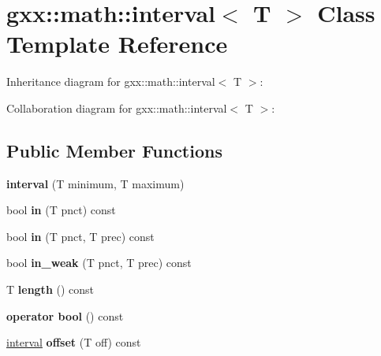 \hypertarget{classgxx_1_1math_1_1interval}{}\section{gxx\+:\+:math\+:\+:interval$<$ T $>$ Class Template Reference}
\label{classgxx_1_1math_1_1interval}


Inheritance diagram for gxx\+:\+:math\+:\+:interval$<$ T $>$\+:


Collaboration diagram for gxx\+:\+:math\+:\+:interval$<$ T $>$\+:
\subsection*{Public Member Functions}
\begin{DoxyCompactItemize}
\item 
{\bfseries interval} (T minimum, T maximum)\hypertarget{classgxx_1_1math_1_1interval_a1dcb0c5fd6571b3015044d20bc426387}{}\label{classgxx_1_1math_1_1interval_a1dcb0c5fd6571b3015044d20bc426387}

\item 
bool {\bfseries in} (T pnct) const \hypertarget{classgxx_1_1math_1_1interval_a21d5b8f8423dea8e65cd32f724f6f5f8}{}\label{classgxx_1_1math_1_1interval_a21d5b8f8423dea8e65cd32f724f6f5f8}

\item 
bool {\bfseries in} (T pnct, T prec) const \hypertarget{classgxx_1_1math_1_1interval_af210817a80079cc339d81fe800ac5407}{}\label{classgxx_1_1math_1_1interval_af210817a80079cc339d81fe800ac5407}

\item 
bool {\bfseries in\+\_\+weak} (T pnct, T prec) const \hypertarget{classgxx_1_1math_1_1interval_add828a8006c2d9e735640f7e093e7d7a}{}\label{classgxx_1_1math_1_1interval_add828a8006c2d9e735640f7e093e7d7a}

\item 
T {\bfseries length} () const \hypertarget{classgxx_1_1math_1_1interval_a4832b09e7b45292d04c12d4ffb9c4dad}{}\label{classgxx_1_1math_1_1interval_a4832b09e7b45292d04c12d4ffb9c4dad}

\item 
{\bfseries operator bool} () const \hypertarget{classgxx_1_1math_1_1interval_ae8791d04fdcfea2d23c73f87df4ab376}{}\label{classgxx_1_1math_1_1interval_ae8791d04fdcfea2d23c73f87df4ab376}

\item 
\hyperlink{classgxx_1_1math_1_1interval}{interval} {\bfseries offset} (T off) const \hypertarget{classgxx_1_1math_1_1interval_a3e48d6860460a806b69de1692c403e48}{}\label{classgxx_1_1math_1_1interval_a3e48d6860460a806b69de1692c403e48}


\end{DoxyCompactItemize}
